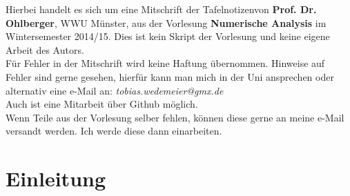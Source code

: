 

\newcommand{\vorlesung}{Numerische Analysis}
\newcommand{\Prof}{Prof. Dr. Ohlberger}
\newcommand{\subt}{Mitschrift der Tafelnotizen}






\maketitle
\thispagestyle{empty}
\cleardoubleoddemptypage

\thispagestyle{empty}
\vspace*{\fill}
\begin{center}
	Hierbei handelt es sich um eine \subt von \textbf{\Prof}, WWU Münster, aus der Vorlesung \textbf{\vorlesung} im Wintersemester 2014/15. 
	Dies ist kein Skript der Vorlesung und keine eigene Arbeit des Autors.\\
	\vspace{2cm}
	Für Fehler in der Mitschrift wird keine Haftung übernommen. 
	Hinweise auf Fehler sind gerne gesehen, hierfür kann man mich in der Uni ansprechen oder alternativ eine e-Mail an: \textit{tobias.wedemeier@gmx.de}\\
	Auch ist eine Mitarbeit über Github möglich.\\
	\vspace{2cm}
	Wenn Teile aus der Vorlesung selber fehlen, können diese gerne an meine e-Mail versandt werden. 
	Ich werde diese dann einarbeiten.\\
\end{center}
\vspace*{\fill}
\cleardoubleoddemptypage


\tableofcontents
\cleardoubleoddemptypage %

\thispagestyle{empty}

\setcounter{section}{-1}

\section{Einleitung}
\label{sec:einleitung}

